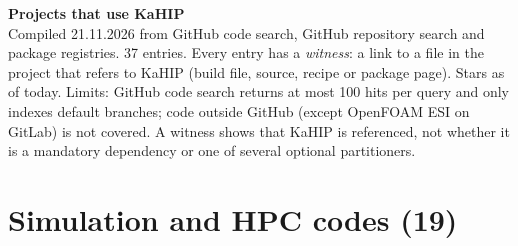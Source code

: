 \documentclass[9pt]{extarticle}
\begin{document}
{\Large\bfseries Projects that use KaHIP}\\[2pt]
Compiled 21.11.2026 from GitHub code search, GitHub repository search and package registries. 37 entries. Every entry has a \emph{witness}: a link to a file in the project that refers to KaHIP (build file, source, recipe or package page). Stars as of today.
Limits: GitHub code search returns at most 100 hits per query and only indexes default branches; code outside GitHub (except OpenFOAM ESI on GitLab) is not covered.
A witness shows that KaHIP is referenced, not whether it is a mandatory dependency or one of several optional partitioners.

\section*{Simulation and HPC codes (19)}
\end{document}
